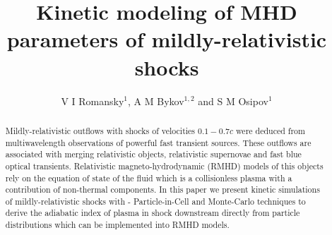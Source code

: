\documentclass[a4paper]{jpconf}
\begin{document}
	\title{Kinetic modeling of MHD parameters of mildly-relativistic shocks}
	
	\author{V I Romansky$^{1}$, A M Bykov$^{1,2}$ and S M Osipov$^{1}$}
	
	\address{$^1$ Ioffe Institute, 26 Politekhnicheskaya st., St. Petersburg 194021, Russia}
	\address{$^2$ Peter the Great St. Petersburg Polytechnic University, 29 Politekhnicheskaya st., St. Petersburg 195251, Russia}
	
	
	\begin{abstract}
    Mildly-relativistic outflows with shocks of  velocities  $0.1 - 0.7 c$ were deduced from multiwavelength observations of powerful fast transient sources. These outflows are associated with  merging relativistic objects, relativistic supernovae and fast blue optical transients. Relativistic  magneto-hydrodynamic (RMHD) models of this objects rely on the equation of state of the fluid which is a collisionless plasma with a contribution of non-thermal components. In this paper we present kinetic simulations of mildly-relativistic shocks with - Particle-in-Cell and Monte-Carlo techniques to derive the adiabatic index of plasma in shock downstream  directly from particle distributions which can be implemented into RMHD models. 
	\end{abstract}
	
\end{document}
